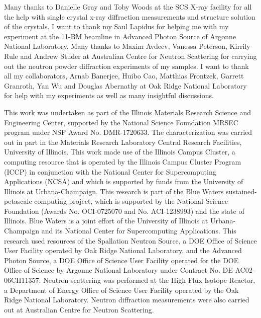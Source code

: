 \documentclass[letterpaper,10pt,doublespacing,edeposit]{uiucthesis2020}
\begin{document}
\begin{frontmatter}
Many thanks to Danielle Gray and Toby Woods at the SCS X-ray facility for all the help with single crystal x-ray diffraction measurements and structure solution of the crystals. I want to thank my Saul Lapidus for helping me with my experiment at the 11-BM beamline in Advanced Photon Source of Argonne National Laboratory. Many thanks to Maxim Avdeev, Vanessa Peterson, Kirrily Rule and Andrew Studer at Australian Centre for Neutron Scattering for carrying out the neutron powder diffraction experiments of my samples. I want to thank all my collaborators, Arnab Banerjee, Huibo Cao, Matthias Frontzek, Garrett Granroth, Yan Wu and Douglas Abernathy at Oak Ridge National Laboratory for help with my experiments as well as many insightful discussions.

This work was undertaken as part of the Illinois Materials Research Science and Engineering Center, supported by the National Science Foundation MRSEC program under NSF Award No. DMR-1720633. The characterization was carried out in part in the Materials Research Laboratory Central Research Facilities, University of Illinois. This work made use of the Illinois Campus Cluster, a computing resource that is operated by the Illinois Campus Cluster Program (ICCP) in conjunction with the National Center for Supercomputing Applications (NCSA) and which is supported by funds from the University of Illinois at Urbana-Champaign. This research is part of the Blue Waters sustained-petascale computing project, which is supported by the National Science Foundation (Awards No. OCI-0725070 and No. ACI-1238993) and the state of Illinois. Blue Waters is a joint effort of the University of Illinois at Urbana-Champaign and its National Center for Supercomputing Applications. This research used resources of the Spallation Neutron Source, a DOE Office of Science User Facility operated by Oak Ridge National Laboratory, and the Advanced Photon Source, a DOE Office of Science User Facility operated for the DOE Office of Science by Argonne National Laboratory under Contract No. DE-AC02-06CH11357. Neutron scattering was performed at the High Flux Isotope Reactor, a Department of Energy Office of Science User Facility operated by the Oak Ridge National Laboratory. Neutron diffraction measurements were also carried out at Australian Centre for Neutron Scattering.



\tableofcontents
\clearpage
\listoftables
\clearpage
\clearpage
\listoffigures

\end{frontmatter}
\end{document}
